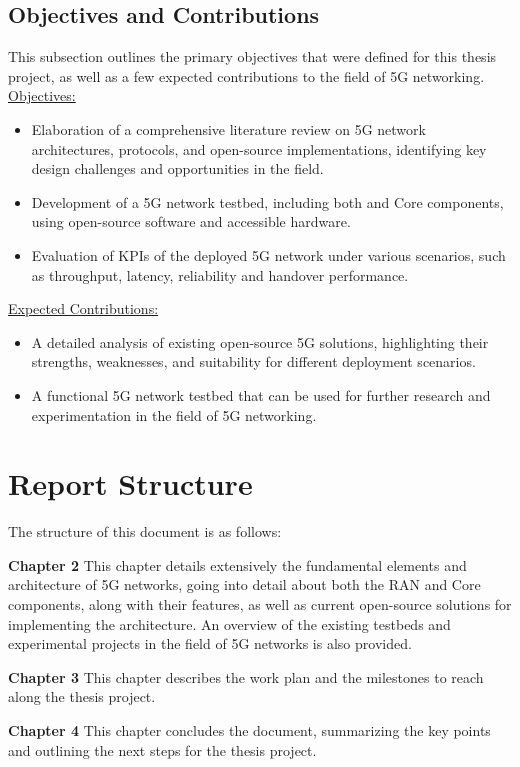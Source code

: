 \subsection{Objectives and Contributions}
\label{sec:objectives_contributions}
This subsection outlines the primary objectives that were defined for this thesis project, as well as a few expected contributions to the field of 5G networking.\\
\underline{Objectives:}
\begin{itemize}
    \item Elaboration of a comprehensive literature review on 5G network architectures, protocols, and open-source implementations, identifying key design challenges and opportunities in the field.
    \item Development of a 5G network testbed, including both  and Core components, using open-source software and accessible hardware.
    \item Evaluation of \glspl{KPI} of the deployed 5G network under various scenarios, such as throughput, latency, reliability and handover performance.
\end{itemize}
\underline{Expected Contributions:}
\begin{itemize}
    \item A detailed analysis of existing open-source 5G solutions, highlighting their strengths, weaknesses, and suitability for different deployment scenarios.
    \item A functional 5G network testbed that can be used for further research and experimentation in the field of 5G networking.
\end{itemize}
\section{Report Structure}
\label{sec:report_structure}
The structure of this document is as follows:
\begin{description}{}
    \item{\textbf{Chapter 2}} This chapter details extensively the fundamental elements and architecture of 5G networks, going into detail about both the \gls{RAN} and Core components, along with their features, as well as current open-source solutions for implementing the architecture. An overview of the existing testbeds and experimental projects in the field of 5G networks is also provided. 
    \item{\textbf{Chapter 3}} This chapter describes the work plan and the milestones to reach along the thesis project.
    \item{\textbf{Chapter 4}} This chapter concludes the document, summarizing the key points and outlining the next steps for the thesis project.
\end{description}
\clearpage